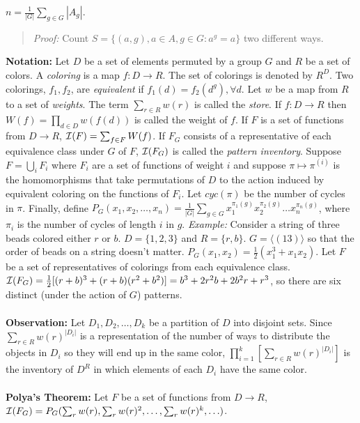 $n= {\frac 1 {|G|}} \sum_{g \in G} |A_g|$.
\begin{quote}
\emph{Proof:}  Count
$S= \{ (a,g), a \in A, g \in G: a^g=a \}$ two different ways.
\end{quote}
{\bf Notation:}
Let $D$ be a set of elements permuted by
a group $G$ and $R$ be a set of colors.  A \emph{coloring} is a map $f:D \rightarrow R$.
The set of colorings is denoted by $R^D$.
Two colorings, $f_1 , f_2$, are \emph{equivalent}
if $f_1(d) = f_2 (d^g ), \forall d$.  Let $w$ be a map from $R$ to a set of \emph{weights}.
The term $\sum_{r \in R} w(r)$ is called the \emph{store}.  If $f: D \rightarrow R$ then
$W(f)= \prod_{d \in D} w(f(d))$ is called the weight of $f$.  If $F$ is a set of
functions from $D \rightarrow R$, ${\cal I}(F)= \sum_{f \in F} W(f)$.  If
$F_G$ consists of a representative of each equivalence class under $G$ of $F$,
${\cal I}(F_G)$ is called the \emph{pattern inventory}.
Suppose $F= \bigcup_i F_i$ where $F_i$ are a set of functions of
weight $i$ and suppose $\pi \mapsto \pi^{(i)}$ is the homomorphisms that
take permutations of $D$ to the
action induced by equivalent coloring on the functions of $F_i$.  
Let $cyc(\pi)$ be the number of cycles in $\pi$.
Finally, define
$P_{G}(x_{1}, x_{2}, \ldots , x_{n})= {\frac {1} {|G|}} \sum_{g \in G}
x_{1}^{\pi_{1}(g)} x_{2}^{\pi_{2}(g)} \ldots x_{n}^{\pi_{n}(g)}$, where $\pi_i$ is the number
of cycles of length $i$ in $g$.
\emph{Example:}  Consider a string of three beads colored either $r$ or $b$.  
$D= \{1,2,3\}$ and $R= \{r, b\}$.  
$G= \langle (13) \rangle$ so that the order of beads on a string doesn't matter.
$P_G(x_1, x_2)= {\frac 1 2} (x_1^3 + x_1 x_2)$.  Let $F$ be a set of representatives
of colorings from each equivalence class.
${\cal I}(F_G)= {\frac 1 2}[(r+b)^3+(r+b)(r^2 + b^2)]= b^3 + 2r^2b + 2 b^2r + r^3$, so there are
six distinct (under the action of $G$) patterns.
\\
\\
{\bf Observation:}
Let $D_1, D_2, \ldots, D_k$ be a partition of $D$ into disjoint sets.
Since $\sum_{r \in R} w(r)^{|D_i|}$ is a
representation of the number of ways to distribute the objects
in $D_i$ so they will end up in the same color,
$\prod_{i=1}^k [\sum_{r \in R} w(r)^{|D_i|}]$ is the inventory of
$D^R$ in which elements of each $D_i$ have the same color.
\\
\\
{\bf Polya's Theorem:} Let $F$ be a set of functions from $D \rightarrow R$,
${\cal I}(F_G)= P_G(\sum_r w(r), \sum_r w(r)^2, \ldots , \sum_r w(r)^k, \ldots)$.
